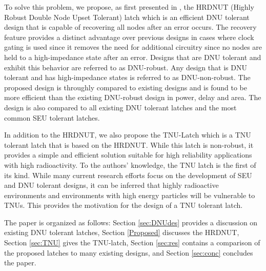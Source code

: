 To solve this problem, we propose, as first presented in \cite{Watkins2016}, the HRDNUT (Highly Robust Double Node Upset Tolerant) latch which is an efficient DNU tolerant design that is capable of recovering all nodes after an error occurs. The recovery feature provides a distinct advantage over previous designs in cases where clock gating is used since it removes the need for additional circuitry since no nodes are held to a high-impedance state after an error. Designs that are DNU tolerant and exhibit this behavior are referred to as DNU-robust. Any design that is DNU tolerant and has high-impedance states is referred to as DNU-non-robust. The proposed design is throughly compared to existing designs and is found to be more efficient than the existing DNU-robust design \cite{DONUT} in power, delay and area. The design is also compared to all existing DNU tolerant latches and the most common SEU tolerant latches.

In addition to the HRDNUT, we also propose the  TNU-Latch which is a TNU tolerant latch that is based on the HRDNUT. While this latch is non-robust, it provides a simple and efficient solution suitable for high reliability applications with high radioactivity. To the authors' knowledge, the TNU latch is the first of its kind. While many current research efforts focus on the development of SEU and DNU tolerant designs, it can be inferred that highly radioactive environments and environments with high energy particles will be vulnerable to TNUs. This provides the motivation for the design of a TNU tolerant latch.

The paper is organized as follows: Section \ref{sec:DNUdes} provides a discussion on existing DNU tolerant latches, Section \ref{Proposed} discusses the HRDNUT, Section \ref{sec:TNU} gives the TNU-latch, Section \ref{sec:res} contains a comparison of the proposed latches to many existing designs, and Section \ref{sec:conc} concludes the paper.